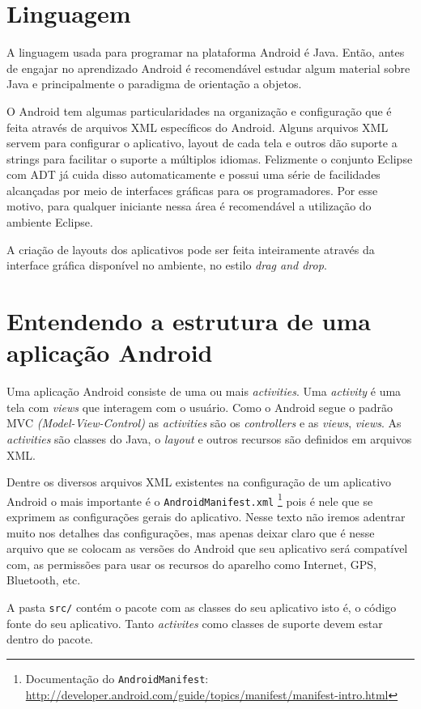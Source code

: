 \documentclass[a4paper,12pt,brazil,oneside]{book}
\begin{document}
\section{Linguagem}
A linguagem usada para programar na plataforma Android é Java. Então, antes de engajar no aprendizado Android é recomendável estudar algum material sobre Java e principalmente o paradigma de orientação a objetos.

O Android tem algumas particularidades na organização e configuração que é feita através de arquivos XML específicos do Android. Alguns arquivos XML servem para configurar o aplicativo, layout de cada tela e outros dão suporte a strings para facilitar o suporte a múltiplos idiomas. Felizmente o conjunto Eclipse com ADT já cuida disso automaticamente e possui uma série de facilidades alcançadas por meio de interfaces gráficas para os programadores. Por esse motivo, para qualquer iniciante nessa área é recomendável a utilização do ambiente Eclipse.

A criação de layouts dos aplicativos pode ser feita inteiramente através da interface gráfica disponível no ambiente, no estilo \textit{drag and drop}. 

\section{Entendendo a estrutura de uma aplicação Android}

Uma aplicação Android consiste de uma ou mais \emph{activities}. Uma \emph{activity} é uma tela com \emph{views} que interagem com o usuário. Como o Android segue o padrão MVC \emph{(Model-View-Control)} as \emph{activities} são os \emph{controllers} e as \emph{views}, \emph{views}. As \emph{activities} são classes do Java, o \emph{layout} e outros recursos são definidos em arquivos XML.

Dentre os diversos arquivos XML existentes na configuração de um aplicativo Android o mais importante é o \texttt{{AndroidManifest.xml}}
\footnote{Documentação do \texttt{AndroidManifest}: \href{The AndroidManifest.xml File}{http://developer.android.com/guide/topics/manifest/manifest-intro.html}}
 pois é nele que se exprimem as configurações gerais do aplicativo. Nesse texto não iremos adentrar muito nos detalhes das configurações, mas apenas deixar claro que é nesse arquivo que se colocam as versões do Android que seu aplicativo será compatível com, as permissões para usar os recursos do aparelho como Internet, GPS, Bluetooth, etc. 
 
 A pasta \texttt{src/} contém o pacote com as classes do seu aplicativo isto é, o código fonte do seu aplicativo. Tanto \emph{activites} como classes de suporte devem estar dentro do pacote.
\end{document}
